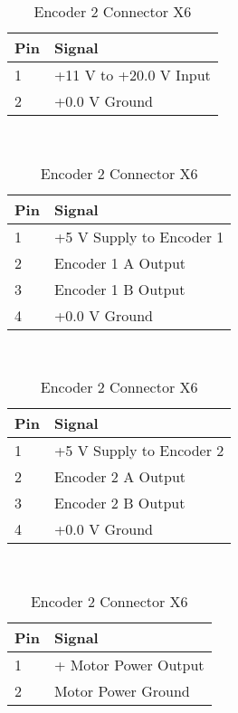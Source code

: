 \documentclass[11pt,a4paper]{article}
\begin{document}
  \begin{table}[h]
    \begin{minipage}{0.45\textwidth}
    \begin{tabular}[b]{|l|l|}
      \hline \textbf{Pin} & \textbf{Signal}\\
      \hline 1 & +11 V to +20.0 V Input\\
      \hline 2 & +0.0 V Ground\\
      \hline
    \end{tabular}
    \caption{Connector X1}
\\  \end{minipage}\hfill
    \begin{minipage}{0.45\textwidth}
    \begin{tabular}[b]{|l|l|}
      \hline \textbf{Pin} & \textbf{Signal}\\
      \hline  1 & +5 V Supply to Encoder 1\\
      \hline  2 & Encoder 1 A Output\\
      \hline  3 & Encoder 1 B Output\\
      \hline  4 & +0.0 V Ground\\
      \hline
    \end{tabular}
    \caption{Encoder 1 Connector X5}
\\
    \end{minipage}\hfill
    \begin{minipage}{0.45\textwidth}
    \begin{tabular}[b]{|l|l|}
      \hline \textbf{Pin} & \textbf{Signal}\\
      \hline 1 & +5 V Supply to Encoder 2\\
      \hline 2 & Encoder 2 A Output\\
      \hline 3 & Encoder 2 B Output\\
      \hline 4 & +0.0 V Ground \\
      \hline
    \end{tabular}
    \caption{Encoder 2 Connector X6}
\\
    \end{minipage}\hfill
    \begin{minipage}{0.45\textwidth}
    \begin{tabular}[b]{|l|l|}
      \hline \textbf{Pin} & \textbf{Signal}\\
      \hline 1 & + Motor Power Output\\
      \hline 2 & Motor Power Ground \\
      \hline
    \end{tabular}

\end{minipage}
\end{table}
\end{document}

